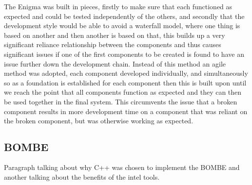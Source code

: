 \documentclass[12pt,a4paper]{article}
\begin{document}
The Enigma was built in pieces, firstly to make sure that each functioned as expected and could be tested independently of the others, and secondly that the development style would be able to avoid a waterfall model, where one thing is based on another and then another is based on that, this builds up a very significant reliance relationship between the components and thus causes significant issues if one of the first components to be created is found to have an issue further down the development chain. Instead of this method an agile method was adopted, each component developed individually, and simultaneously so as a foundation is established for each component then this is built upon until we reach the point that all components function as expected and they can then be used together in the final system. This circumvents the issue that a broken component results in more development time on a component that was reliant on the broken component, but was otherwise working as expected.

\subsection{BOMBE}

Paragraph talking about why C++ was chosen to implement the BOMBE and another talking about the benefits of the intel tools.\\
\end{document}
